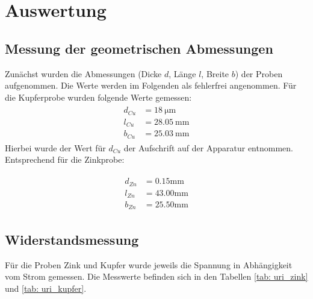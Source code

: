 \newpage

\section{Auswertung}

\subsection{Messung der geometrischen Abmessungen}
Zunächst wurden die Abmessungen (Dicke $d$, Länge $l$, Breite $b$) der Proben aufgenommen. Die Werte
werden im Folgenden als fehlerfrei angenommen. Für die Kupferprobe wurden folgende Werte gemessen:
\begin{align}
  \begin{aligned}
    d_{Cu} &= \SI{18}{\micro \meter} \\
    l_{Cu} &= \SI{28.05}{\milli \meter}\\
    b_{Cu} &= \SI{25.03}{\milli \meter}
        \label{eq: abmessungen_kupfer}
      \end{aligned}
\end{align}
Hierbei wurde der Wert für $d_{Cu}$ der Aufschrift auf der Apparatur entnommen.
Entsprechend für die Zinkprobe:

\begin{align}
  \begin{aligned}
    d_{Zn} &= 0.15 \si{\milli \meter} \\ %
    l_{Zn} &= 43.00 \si{\milli \meter}\\
    b_{Zn} &= 25.50 \si{\milli \meter}
        \label{eq: abmessungen_zink}
      \end{aligned}
\end{align}



\subsection{Widerstandsmessung}
Für die Proben Zink und Kupfer wurde jeweils die Spannung in Abhängigkeit vom Strom gemessen. Die Messwerte befinden sich
in den Tabellen \ref{tab: uri_zink} und \ref{tab: uri_kupfer}.

\begin{minipage}{\textwidth}

\hfill

\end{minipage}

